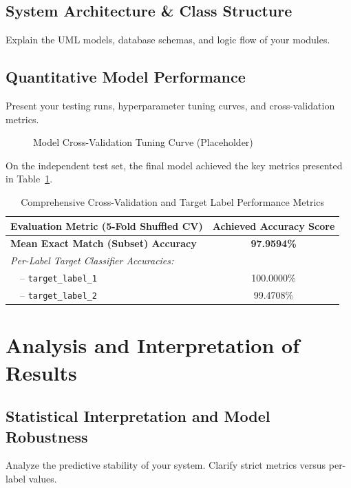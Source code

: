 \documentclass[12pt,a4paper]{report}
\begin{document}
\section{System Architecture & Class Structure}
Explain the UML models, database schemas, and logic flow of your modules.

\section{Quantitative Model Performance}
Present your testing runs, hyperparameter tuning curves, and cross-validation metrics.
\begin{figure}[H]
  \centering
  \caption{Model Cross-Validation Tuning Curve (Placeholder)}
  \label{fig:cv_curve}
\end{figure}

On the independent test set, the final model achieved the key metrics presented in Table~\ref{tab:model_metrics}.

\begin{table}[H]
  \centering
  \small
  \caption{Comprehensive Cross-Validation and Target Label Performance Metrics}
  \label{tab:model_metrics}
  \vspace{0.3cm}
  \begin{tabular}{lc}
    \toprule
    \textbf{Evaluation Metric (5-Fold Shuffled CV)} & \textbf{Achieved Accuracy Score} \\
    \midrule
    \textbf{Mean Exact Match (Subset) Accuracy} & \textbf{97.9594\%} \\
    \midrule
    \textit{Per-Label Target Classifier Accuracies:} & \\
    \ \ -- \texttt{target\_label\_1} & 100.0000\% \\
    \ \ -- \texttt{target\_label\_2} & 99.4708\% \\
    \bottomrule
  \end{tabular}
\end{table}

\chapter{Analysis and Interpretation of Results}
\section{Statistical Interpretation and Model Robustness}
Analyze the predictive stability of your system. Clarify strict metrics versus per-label values.
\end{document}
